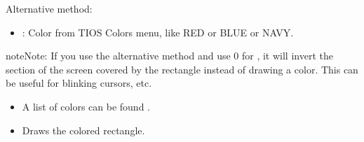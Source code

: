 \documentclass[letterpaper,10pt,english]{sphinxmanual}
\begin{document}
\begin{description}
\sphinxAtStartPar
Alternative method: 
\begin{itemize}
\item {} 
\sphinxAtStartPar
{}: Color from TI\sphinxhyphen{}OS Colors menu, like RED or BLUE or NAVY.

\end{itemize}

\begin{sphinxadmonition}{note}{Note:}
\sphinxAtStartPar
If you use the alternative method and use 0 for , it will invert the section of the screen covered by the rectangle instead of drawing a color. This can be useful for blinking cursors, etc.
\end{sphinxadmonition}
\begin{description}
\begin{itemize}
\item {} 
\sphinxAtStartPar
A list of colors can be found .

\end{itemize}

\begin{itemize}
\item {} 
\sphinxAtStartPar
Draws the colored rectangle.

\end{itemize}

\end{description}

\end{description}



\renewcommand{\indexname}{Index}
\printindex
\end{document}
